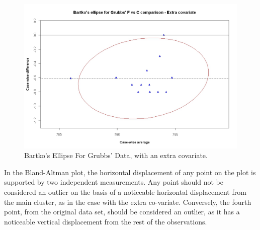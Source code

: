 \documentclass[12pt, a4paper]{report}
\theoremstyle{plain}
\theoremstyle{definition}
\theoremstyle{remark}
\begin{document}
		\begin{figure}[h!]
			\includegraphics[width=130mm]{images/GrubbsBartko2.jpeg}
			\caption{Bartko's Ellipse For Grubbs' Data, with an extra covariate.}\label{GrubbsBartko2}
		\end{figure}
		
		In the Bland-Altman plot, the horizontal displacement of any point on the plot is supported by two independent measurements. Any point should not be considered an outlier on the basis of a noticeable horizontal displacement from the main cluster, as in the case with the extra co-variate. Conversely, the fourth point, from the original data set, should be considered an
		outlier, as it has a noticeable vertical displacement from the rest of the observations.
\end{document}
